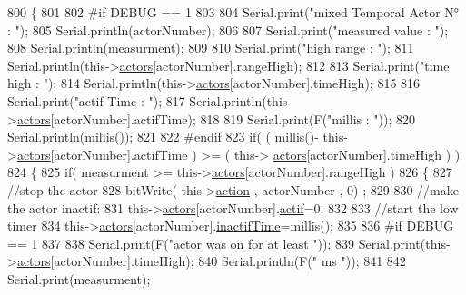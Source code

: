 \begin{DoxyCode}
800 \{
801 
802 \textcolor{preprocessor}{#if DEBUG == 1}
803     
804     Serial.print(\textcolor{stringliteral}{"mixed Temporal Actor N° : "});
805     Serial.println(actorNumber);
806 
807     Serial.print(\textcolor{stringliteral}{"measured value : "});
808     Serial.println(measurment);
809 
810     Serial.print(\textcolor{stringliteral}{"high range : "});
811     Serial.println(this->\hyperlink{class_jetpack_a7e16d2f97837f9712a2e6de1c50d99db}{actors}[actorNumber].rangeHigh);
812 
813     Serial.print(\textcolor{stringliteral}{"time high : "});
814     Serial.println(this->\hyperlink{class_jetpack_a7e16d2f97837f9712a2e6de1c50d99db}{actors}[actorNumber].timeHigh);
815 
816     Serial.print(\textcolor{stringliteral}{"actif Time : "});
817     Serial.println(this->\hyperlink{class_jetpack_a7e16d2f97837f9712a2e6de1c50d99db}{actors}[actorNumber].actifTime);
818 
819     Serial.print(F(\textcolor{stringliteral}{"millis : "}));
820     Serial.println(millis());
821 
822 \textcolor{preprocessor}{#endif}
823     \textcolor{keywordflow}{if}( ( millis()- this->\hyperlink{class_jetpack_a7e16d2f97837f9712a2e6de1c50d99db}{actors}[actorNumber].actifTime  ) >= (  this->
      \hyperlink{class_jetpack_a7e16d2f97837f9712a2e6de1c50d99db}{actors}[actorNumber].timeHigh  ) )
824     \{   
825         \textcolor{keywordflow}{if}( measurment >= this->\hyperlink{class_jetpack_a7e16d2f97837f9712a2e6de1c50d99db}{actors}[actorNumber].rangeHigh )
826         \{
827             \textcolor{comment}{//stop the actor}
828             bitWrite( this->\hyperlink{class_jetpack_aca3142925a7b0834b34ae91d26af7765}{action} , actorNumber , 0) ;
829 
830             \textcolor{comment}{//make the actor inactif:}
831             this->\hyperlink{class_jetpack_a7e16d2f97837f9712a2e6de1c50d99db}{actors}[actorNumber].\hyperlink{struct_jetpack_1_1state_aa177541689bbaea21a4650a083b0df77}{actif}=0;
832 
833             \textcolor{comment}{//start the low timer}
834             this->\hyperlink{class_jetpack_a7e16d2f97837f9712a2e6de1c50d99db}{actors}[actorNumber].\hyperlink{struct_jetpack_1_1state_aaf817b1f9e7a4d65b9e3ca4726b281f6}{inactifTime}=millis();
835 
836 \textcolor{preprocessor}{        #if DEBUG == 1 }
837 
838             Serial.print(F(\textcolor{stringliteral}{"actor was on for at least "}));
839             Serial.print(this->\hyperlink{class_jetpack_a7e16d2f97837f9712a2e6de1c50d99db}{actors}[actorNumber].timeHigh);
840             Serial.println(F(\textcolor{stringliteral}{" ms "}));
841 
842             Serial.print(measurment);

\end{DoxyCode}

